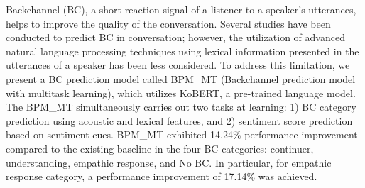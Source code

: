 Backchannel (BC), a short reaction signal of a listener to a speaker's utterances, helps to improve the quality of the conversation. Several studies have been conducted to predict BC in conversation; however, the utilization of advanced natural language processing techniques using lexical information presented in the utterances of a speaker has been less considered. To address this limitation, we present a BC prediction model called BPM\_MT (Backchannel prediction model with multitask learning), which utilizes KoBERT, a pre-trained language model. The BPM\_MT simultaneously carries out two tasks at learning: 1) BC category prediction using acoustic and lexical features, and 2) sentiment score prediction based on sentiment cues. BPM\_MT exhibited 14.24\% performance improvement compared to the existing baseline in the four BC categories: continuer, understanding, empathic response, and No BC. In particular, for empathic response category, a performance improvement of 17.14\% was achieved.

